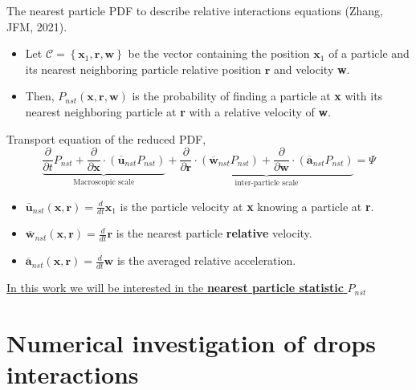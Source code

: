 \documentclass{sintefbeamer}
\newcommand{\nstavg}[1]{\overline{#1}_{nst}}
\newcommand{\ddt}{\frac{d}{d t}}
\newcommand{\pddt}{\frac{\partial}{\partial t}}
\begin{document}
\begin{frame}{The nearest particle PDF   to describe relative interactions equations (Zhang, JFM, 2021).}
  \begin{definition}
    \begin{itemize}
      \item Let $\mathscr{C} =\left\{\textbf{x}_1, \textbf{r}, \textbf{w}\right\}$ be the vector containing the position $\textbf{x}_1$ of a particle and its nearest neighboring particle relative position $\textbf{r}$ and velocity \textbf{w}.
      \item Then, $P_{nst}(\textbf{x},\textbf{r},\textbf{w}) $ is the probability of finding a particle at \textbf{x} with its nearest neighboring particle at \textbf{r} with a relative velocity of \textbf{w}. 
    \end{itemize}
  \end{definition}
  Transport equation of the reduced PDF,
  \begin{equation*}
    \underbrace{
      \pddt P_{nst}
      + \frac{\partial}{\partial\textbf{x}} \cdot
      \left(
        \nstavg{\textbf{u}}
        P_{nst}
      \right)
    }_{\text{Macroscopic scale}}
    + 
    \underbrace{
      \frac{\partial}{\partial \textbf{r}} \cdot
    \left(
        \nstavg{\textbf{w}}
        P_{nst}
    \right)
      + \frac{\partial}{\partial \textbf{w}} \cdot
    \left(
        \nstavg{\textbf{a}}
        P_{nst}
    \right)
    }_{\text{inter-particle scale}}
    = \Psi
    \label{eq:dt_P_nst}
\end{equation*}

  \begin{itemize}
    \item $\nstavg{\textbf{u}}(\textbf{x},\textbf{r}) = \ddt \textbf{x}_1$ is the particle velocity at \textbf{x} knowing a particle at \textbf{r}. 
    \item $\nstavg{\textbf{w}}(\textbf{x},\textbf{r}) = \ddt \textbf{r}$ is the nearest particle \textbf{relative} velocity. 
    \item $\nstavg{\textbf{a}}(\textbf{x},\textbf{r}) = \ddt \textbf{w}$ is the averaged relative acceleration.
  \end{itemize}
  \underline{In this work we will be interested in the \textbf{nearest particle statistic} $P_{nst}$}
\end{frame}


\section{Numerical investigation of drops interactions}
\end{document}
